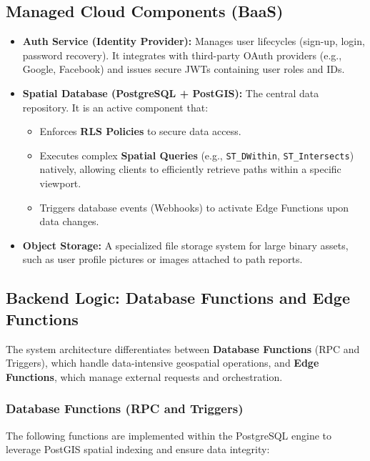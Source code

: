 \subsection{Managed Cloud Components (BaaS)}
\begin{itemize}
    \item \textbf{Auth Service (Identity Provider):} Manages user lifecycles (sign-up, login, password recovery). It integrates with third-party OAuth providers (e.g., Google, Facebook) and issues secure JWTs containing user roles and IDs.
    
    \item \textbf{Spatial Database (PostgreSQL + PostGIS):} The central data repository. It is an active component that:
    \begin{itemize}
        \item Enforces \textbf{RLS Policies} to secure data access.
        \item Executes complex \textbf{Spatial Queries} (e.g., \texttt{ST\_DWithin}, \texttt{ST\_Intersects}) natively, allowing clients to efficiently retrieve paths within a specific viewport.
        \item Triggers database events (Webhooks) to activate Edge Functions upon data changes.
    \end{itemize}
    
    \item \textbf{Object Storage:} A specialized file storage system for large binary assets, such as user profile pictures or images attached to path reports.
\end{itemize}

\subsection{Backend Logic: Database Functions and Edge Functions}
The system architecture differentiates between \textbf{Database Functions} (RPC and Triggers), which handle data-intensive geospatial operations, and \textbf{Edge Functions}, which manage external requests and orchestration.

\subsubsection{Database Functions (RPC and Triggers)}
The following functions are implemented within the PostgreSQL engine to leverage PostGIS spatial indexing and ensure data integrity:


